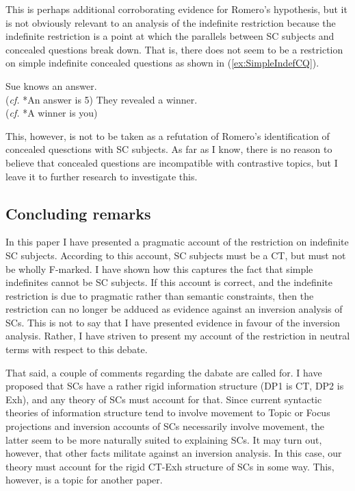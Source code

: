 \documentclass[
	letterpaper,
]{article}
\begin{document}
This is perhaps additional corroborating evidence for Romero's hypothesis, but it is not obviously relevant to an analysis of the indefinite restriction because the indefinite restriction is a point at which the parallels between SC subjects and concealed questions break down.
That is, there does not seem to be a restriction on simple indefinite concealed questions as shown in (\ref{ex:SimpleIndefCQ}).
\begin{exe}
	\ex\label{ex:SimpleIndefCQ}
	\begin{xlist}
		\ex Sue knows an answer.\\
		(\textit{cf.} *An answer is 5)
		\ex They revealed a winner.\\
		(\textit{cf.} *A winner is you)
	\end{xlist}
\end{exe}
This, however, is not to be taken as a refutation of Romero's identification of concealed quesctions with SC subjects.
As far as I know, there is no reason to believe that concealed questions are incompatible with contrastive topics, but I leave it to further research to investigate this.
\subsection{Concluding remarks}
In this paper I have presented a pragmatic account of the restriction on indefinite SC subjects.
According to this account, SC subjects must be a CT, but must not be wholly F-marked.
I have shown how this captures the fact that simple indefinites cannot be SC subjects.
If this account is correct, and the indefinite restriction is due to pragmatic rather than semantic constraints, then the restriction can no longer be adduced as evidence against an inversion analysis of SCs. 
This is not to say that I have presented evidence in favour of the inversion analysis.
Rather, I have striven to present my account of the restriction in neutral terms with respect to this debate.

That said, a couple of comments regarding the dabate are called for.
I have proposed that SCs have a rather rigid information structure (DP1 is CT, DP2 is Exh), and any theory of SCs must account for that.
Since current syntactic theories of information structure tend to involve movement to Topic or Focus projections and inversion accounts of SCs necessarily involve movement, the latter seem to be more naturally suited to explaining SCs.
It may turn out, however, that other facts militate against an inversion analysis.
In this case, our theory must account for the rigid CT-Exh structure of SCs in some way.
This, however, is a topic for another paper.
\end{document}
